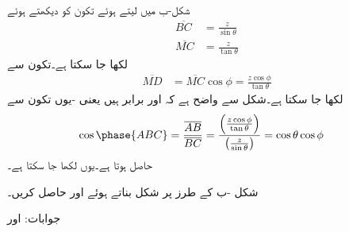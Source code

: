 شکل-ب میں  لیتے ہوئے تکون    کو دیکھتے ہوئے
\begin{align*}
\overline{BC}&=\frac{z}{\sin \theta}   \\
\overline{MC}&=\frac{z}{\tan \theta} 
\end{align*}
لکھا جا سکتا ہے۔تکون  سے
\begin{align*}
\overline{MD}&=\overline{MC} \cos \phi=\frac{z \cos \phi}{\tan \theta} 
\end{align*} 
لکھا جا سکتا ہے۔شکل سے واضح ہے کہ  اور  برابر ہیں یعنی -یوں تکون  سے
\begin{align*}
\cos \phase{ABC}&=\frac{\overline{AB}}{\overline{BC}}=\frac{\left(\frac{z \cos \phi}{\tan \theta}\right)}{\left(\frac{z}{\sin \theta}\right)}=\cos \theta \cos \phi
\end{align*}
حاصل ہوتا ہے۔یوں  لکھا جا سکتا ہے۔

شکل -ب کے طرز پر شکل بناتے ہوئے  اور  حاصل کریں۔

جوابات: اور 
